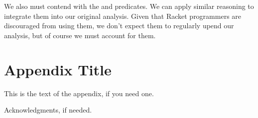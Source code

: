 \documentclass{sigplanconf}
\begin{document}
We also must contend with the  and  predicates. We can apply similar reasoning to integrate them into our original analysis.
Given that Racket programmers are discouraged from using them, we don't expect them to regularly upend our analysis, but of course we must account for them.





\appendix
\section{Appendix Title}

This is the text of the appendix, if you need one.

\acks

Acknowledgments, if needed.









\end{document}
